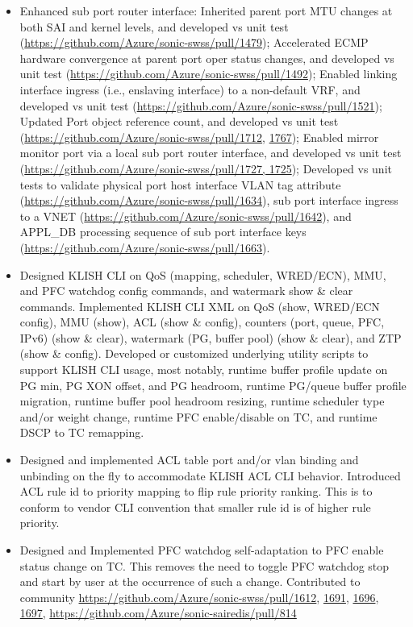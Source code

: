 \documentclass[letterpaper,11pt]{article}
\newcommand{\resitem}[1]{\item #1 \vspace{-2pt}}
\begin{document}
\begin{CJK}{UTF8}{gbsn}
\begin{itemize}
\begin{itemize}
  \resitem{Enhanced sub port router interface: Inherited parent port MTU changes at both SAI and kernel levels, and developed vs unit test
  (\url{https://github.com/Azure/sonic-swss/pull/1479});
  Accelerated ECMP hardware convergence at parent port oper status changes, and developed vs unit test
  (\url{https://github.com/Azure/sonic-swss/pull/1492});
  Enabled linking interface ingress (i.e., enslaving interface) to a non-default VRF, and developed vs unit test
  (\url{https://github.com/Azure/sonic-swss/pull/1521});
  Updated Port object reference count, and developed vs unit test
  (\url{https://github.com/Azure/sonic-swss/pull/1712}, \url{1767});
  Enabled mirror monitor port via a local sub port router interface, and developed vs unit test
  (\url{https://github.com/Azure/sonic-swss/pull/1727, 1725});
  Developed vs unit tests to validate physical port host interface VLAN tag attribute 
  (\url{https://github.com/Azure/sonic-swss/pull/1634}),
  sub port interface ingress to a VNET (\url{https://github.com/Azure/sonic-swss/pull/1642}),
  and APPL\_DB processing sequence of sub port interface keys (\url{https://github.com/Azure/sonic-swss/pull/1663}).}
  \resitem{Designed KLISH CLI on QoS (mapping, scheduler, WRED/ECN), MMU, and PFC watchdog config commands, and watermark show \& clear commands. 
  Implemented KLISH CLI XML on QoS (show, WRED/ECN config), MMU (show), ACL (show \& config),
  counters (port, queue, PFC, IPv6) (show \& clear), watermark (PG, buffer pool) (show \& clear), and ZTP (show \& config).
  Developed or customized underlying utility scripts to support KLISH CLI usage, most notably,
  runtime buffer profile update on PG min, PG XON offset, and PG headroom,
  runtime PG/queue buffer profile migration,
  runtime buffer pool headroom resizing,
  runtime scheduler type and/or weight change,
  runtime PFC enable/disable on TC,
  and runtime DSCP to TC remapping.}
  \resitem{Designed and implemented ACL table port and/or vlan binding and unbinding on the fly to accommodate KLISH ACL CLI behavior.
  Introduced ACL rule id to priority mapping to flip rule priority ranking.
  This is to conform to vendor CLI convention that smaller rule id is of higher rule priority.}
  \resitem{Designed and Implemented PFC watchdog self-adaptation to PFC enable status change on TC.
  This removes the need to toggle PFC watchdog stop and start by user at the occurrence of such a change. Contributed to community
  \url{https://github.com/Azure/sonic-swss/pull/1612}, \url{1691}, \url{1696}, \url{1697}, \url{https://github.com/Azure/sonic-sairedis/pull/814}}

\end{itemize}
\end{itemize}
\end{CJK}
\end{document}
